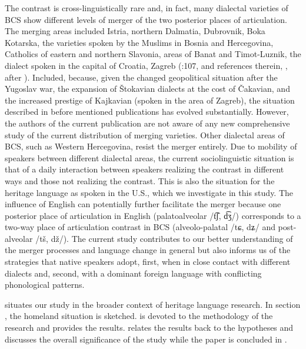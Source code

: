 \documentclass[output=paper,modfonts,nonflat,
]{langsci/langscibook}
\begin{document}
The contrast is cross-linguistically rare and, in fact, many dialectal varieties of BCS show different levels of merger of the two posterior places of articulation. The merging areas included Istria, northern Dalmatia, Dubrovnik, Boka Kotarska, the varieties spoken by the Muslims in Bosnia and Hercegovina, Catholics of eastern and northern Slavonia, areas of Banat and Timot-Luznik, the dialect spoken in the capital of Croatia, Zagreb (\citealt{Stankiewicz1986}:107, and references therein, \citealt[296]{Ivić1958}, \citealt{Żygis2003} after \citealt{Ivić1958}). Included, because, given the changed geopolitical situation after the Yugoslav war, the expansion of Štokavian dialects at the cost of Čakavian, and the increased prestige of Kajkavian (spoken in the area of Zagreb), the situation described in before mentioned publications has evolved substantially. However, the authors of the current publication are not aware of any new comprehensive study of the current distribution of merging varieties. Other dialectal areas of BCS, such as Western Hercegovina, resist the merger entirely. Due to mobility of speakers between different dialectal areas, the current sociolinguistic situation is that of a daily interaction between speakers realizing the contrast in different ways and those not realizing the contrast. This is also the situation for the heritage language as spoken in the U.S., which we investigate in this study. The influence of English can potentially further facilitate the merger because one posterior place of articulation in English (palatoalveolar /t͡ʃ, d͡ʒ/) corresponds to a two-way place of articulation contrast in BCS (alveolo-palatal /tɕ, dʑ/ and post-alveolar /tš, dž/). The current study contributes to our better understanding of the merger processes and language change in general but also informs us of the strategies that native speakers adopt, first, when in close contact with different dialects and, second, with a dominant foreign language with conflicting phonological patterns.



 situates our study in the broader context of heritage language research. 
In section , the homeland situation is sketched.  is devoted to the methodology of the research and  provides the results. 
 relates the results back to the hypotheses and discusses the overall significance of the study while the paper is concluded in .
\end{document}
